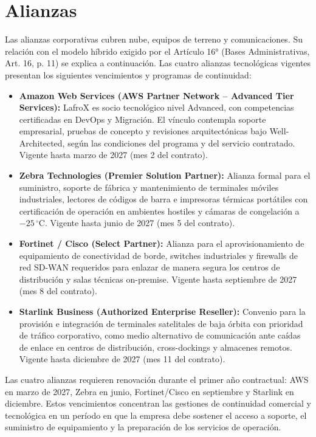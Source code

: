 \section{Alianzas}

Las alianzas corporativas cubren nube, equipos de terreno y comunicaciones. Su relación con el modelo híbrido exigido por el Artículo 16° (Bases Administrativas, Art. 16, p. 11) se explica a continuación. Las cuatro alianzas tecnológicas vigentes presentan los siguientes vencimientos y programas de continuidad:
\begin{itemize}
    \item \textbf{Amazon Web Services (AWS Partner Network -- Advanced Tier Services):} LafroX es socio tecnológico nivel Advanced, con competencias certificadas en DevOps y Migración. El vínculo contempla soporte empresarial, pruebas de concepto y revisiones arquitectónicas bajo Well-Architected, según las condiciones del programa y del servicio contratado. Vigente hasta marzo de 2027 (mes 2 del contrato).
    \item \textbf{Zebra Technologies (Premier Solution Partner):} Alianza formal para el suministro, soporte de fábrica y mantenimiento de terminales móviles industriales, lectores de códigos de barra e impresoras térmicas portátiles con certificación de operación en ambientes hostiles y cámaras de congelación a $-25\,^{\circ}\mathrm{C}$. Vigente hasta junio de 2027 (mes 5 del contrato).
    \item \textbf{Fortinet / Cisco (Select Partner):} Alianza para el aprovisionamiento de equipamiento de conectividad de borde, switches industriales y firewalls de red SD-WAN requeridos para enlazar de manera segura los centros de distribución y salas técnicas on-premise. Vigente hasta septiembre de 2027 (mes 8 del contrato).
    \item \textbf{Starlink Business (Authorized Enterprise Reseller):} Convenio para la provisión e integración de terminales satelitales de baja órbita con prioridad de tráfico corporativo, como medio alternativo de comunicación ante caídas de enlace en centros de distribución, cross-dockings y almacenes remotos. Vigente hasta diciembre de 2027 (mes 11 del contrato).
\end{itemize}

Las cuatro alianzas requieren renovación durante el primer año contractual: AWS en marzo de 2027, Zebra en junio, Fortinet/Cisco en septiembre y Starlink en diciembre. Estos vencimientos concentran las gestiones de continuidad comercial y tecnológica en un período en que la empresa debe sostener el acceso a soporte, el suministro de equipamiento y la preparación de los servicios de operación.

